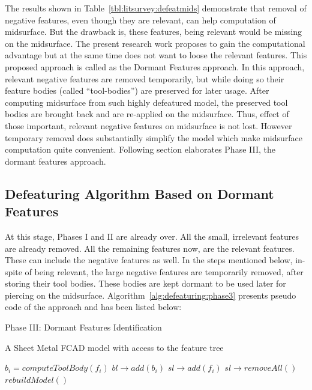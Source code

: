 The results shown in Table~\ref{tbl:litsurvey:defeatmids} demonstrate that removal of negative features, even though they are relevant, can help computation of midsurface. But the drawback is, these features, being relevant would be missing on the midsurface. The present research work proposes to gain the computational advantage but at the same time does not want to loose the relevant features. This proposed approach is called as the Dormant Features approach. In this approach, relevant negative features are removed temporarily, but while doing so their feature bodies (called ``tool-bodies'') are preserved for later usage. After computing midsurface from such highly defeatured model, the preserved tool bodies are brought back and are re-applied on the midsurface. Thus, effect of those important, relevant negative features on midsurface is not lost. However temporary removal does substantially simplify the model which make midsurface computation quite convenient. Following section elaborates Phase III, the dormant features approach.


\subsection{Defeaturing Algorithm Based on Dormant Features}\label{sec:defeature:dormantalgo}


At this stage, Phases I and II are already over. All the small, irrelevant features are already removed. All the remaining features now, are the relevant features. These can include the negative features as well. In the steps mentioned below, in-spite of being relevant, the large negative features are temporarily removed, after storing their tool bodies. These bodies are kept dormant to be used later for piercing on the midsurface. Algorithm~\ref{alg:defeaturing:phase3} presents pseudo code of the approach and has been listed below: 

\bigskip


\begin{algorithm}[H]
	\caption{Phase III: Dormant Features Identification}
	\label{alg:defeaturing:phase3}
	\begin{algorithmic}[1]
		\REQUIRE A Sheet Metal FCAD model with access to the feature tree
		
				\STATE $b_i = computeToolBody(f_i)$
				\STATE $bl \rightarrow add(b_i)$
				\STATE $sl \rightarrow add(f_i)$
			\ENDIF
		\ENDWHILE
		\STATE  $sl \rightarrow removeAll()$
		\STATE  $rebuildModel()$
	\end{algorithmic}
\end{algorithm}

